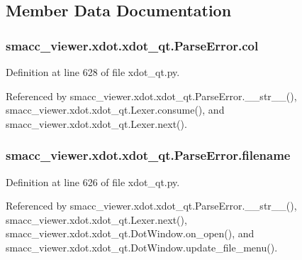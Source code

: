\subsection{Member Data Documentation}
\subsubsection[{\texorpdfstring{col}{col}}]{\setlength{\rightskip}{0pt plus 5cm}smacc\+\_\+viewer.\+xdot.\+xdot\+\_\+qt.\+Parse\+Error.\+col}\hypertarget{classsmacc__viewer_1_1xdot_1_1xdot__qt_1_1ParseError_acacdd5b9b260b2cbe7532e952a0b84e2}{}\label{classsmacc__viewer_1_1xdot_1_1xdot__qt_1_1ParseError_acacdd5b9b260b2cbe7532e952a0b84e2}


Definition at line 628 of file xdot\+\_\+qt.\+py.



Referenced by smacc\+\_\+viewer.\+xdot.\+xdot\+\_\+qt.\+Parse\+Error.\+\_\+\+\_\+str\+\_\+\+\_\+(), smacc\+\_\+viewer.\+xdot.\+xdot\+\_\+qt.\+Lexer.\+consume(), and smacc\+\_\+viewer.\+xdot.\+xdot\+\_\+qt.\+Lexer.\+next().

\subsubsection[{\texorpdfstring{filename}{filename}}]{\setlength{\rightskip}{0pt plus 5cm}smacc\+\_\+viewer.\+xdot.\+xdot\+\_\+qt.\+Parse\+Error.\+filename}\hypertarget{classsmacc__viewer_1_1xdot_1_1xdot__qt_1_1ParseError_a9d525ed20879f49c2d61e807a982dbe1}{}\label{classsmacc__viewer_1_1xdot_1_1xdot__qt_1_1ParseError_a9d525ed20879f49c2d61e807a982dbe1}


Definition at line 626 of file xdot\+\_\+qt.\+py.



Referenced by smacc\+\_\+viewer.\+xdot.\+xdot\+\_\+qt.\+Parse\+Error.\+\_\+\+\_\+str\+\_\+\+\_\+(), smacc\+\_\+viewer.\+xdot.\+xdot\+\_\+qt.\+Lexer.\+next(), smacc\+\_\+viewer.\+xdot.\+xdot\+\_\+qt.\+Dot\+Window.\+on\+\_\+open(), and smacc\+\_\+viewer.\+xdot.\+xdot\+\_\+qt.\+Dot\+Window.\+update\+\_\+file\+\_\+menu().

